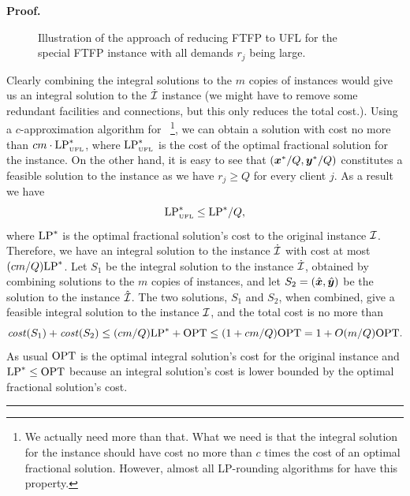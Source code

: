 \documentclass[oneside,final]{ucr}
\newenvironment{proof}[1][Proof]{\textbf{#1.} }{\ \rule{0.5em}{0.5em}}
\def\dsp{\def\baselinestretch{2.0}\large\normalsize}
\begin{document}
\begin{proof}
\begin{figure}[ht]
    \caption{Illustration of the approach of reducing FTFP to UFL for the special FTFP instance with all demands $r_j$ being large.}
    \label{fig:asymptotic_ratio}
  \end{figure}
  \dsp
  Clearly combining the integral solutions to the $m$
  copies of {\UFL} instances would give us an integral
  solution to the $\dot {\mathcal{I}}$ instance (we might have to
  remove some redundant facilities and connections, but this
  only reduces the total cost.). Using a $c$-approximation
  algorithm for {\UFL}~\footnote{We actually need more than
    that. What we need is that the integral solution for the
    {\UFL} instance should have cost no more than $c$ times
    the cost of an optimal fractional solution. However,
    almost all LP-rounding algorithms for {\UFL} have this
    property.}, we can obtain a solution with cost no more
  than $c m \cdot \mbox{\rm LP}_{\mbox{\tiny\rm UFL}}^\ast$, where
  $\mbox{\rm LP}_{\mbox{\tiny\rm UFL}}^\ast$ is the cost of the optimal
  fractional solution for the {\UFL} instance. On the other
  hand, it is easy to see that $(\boldsymbol{x}^\ast/Q,\boldsymbol{y}^\ast/Q)$
  constitutes a feasible solution to the {\UFL} instance as
  we have $r_j \geq Q$ for every client $j$. As a result we
  have
  \begin{equation*}
    \mbox{\rm LP}_{\mbox{\tiny\rm UFL}}^\ast \leq \mbox{\rm LP}^\ast / Q,
  \end{equation*}
  where $\mbox{\rm LP}^\ast$ is the optimal fractional solution's cost
  to the original {\FTFP} instance $\mathcal{I}$. Therefore, we
  have an integral solution to the instance $\dot{\mathcal{I}}$ with
  cost at most $(cm/Q) \mbox{\rm LP}^\ast$. Let $S_1$ be the integral
  solution to the instance $\dot{\mathcal{I}}$, obtained by
  combining solutions to the $m$ copies of {\UFL} instances,
  and let $S_2 = (\hat{\boldsymbol{x}},\hat{\boldsymbol{y}})$ be the solution to the
  instance $\hat{\mathcal{I}}$. The two solutions, $S_1$ and $S_2$,
  when combined, give a feasible integral solution to the
  instance $\mathcal{I}$, and the total cost is no more than
  \begin{equation*}
    {\it cost}(S_1) + {\it cost}(S_2) \leq (cm/Q) \mbox{\rm LP}^\ast + \mbox{\rm OPT} \leq (1 +
    cm/Q) \mbox{\rm OPT} = 1 + O(m/Q) \mbox{\rm OPT}.
  \end{equation*}
  As usual $\mbox{\rm OPT}$ is the optimal integral solution's cost
  for the original {\FTFP} instance and $\mbox{\rm LP}^\ast \leq \mbox{\rm OPT}$
  because an integral solution's cost is lower bounded by
  the optimal fractional solution's cost.
\end{proof}
\end{document}
